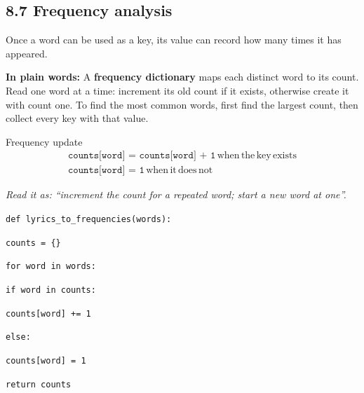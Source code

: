 \documentclass[11pt]{article}
\begin{document}
\begin{keepsection}
\section{8.7 Frequency analysis}

Once a word can be used as a key, its value can record how many times it has appeared.

\begin{plainbox}\textbf{In plain words:} A \textbf{frequency dictionary} maps each distinct word to its count. Read one word at a time: increment its old count if it exists, otherwise create it with count one. To find the most common words, first find the largest count, then collect every key with that value.\end{plainbox}

\begin{equationcard}{Frequency update}
\[ \begin{gathered} \texttt{counts[word] = counts[word] + 1}\, \text{when}\, \text{the}\, \text{key}\, \text{exists} \\ \texttt{counts[word] = 1}\, \text{when}\, \text{it}\, \text{does}\, \text{not} \end{gathered} \]
{\small \emph{Read it as: “increment the count for a repeated word; start a new word at one”.}\par }
\end{equationcard}
\begin{tcolorbox}[colback=Paperblue,colframe=Paperblue,boxrule=0pt,arc=0pt,left=7pt,right=7pt,top=5pt,bottom=5pt]\small\sloppy
\noindent\hspace*{0em}\texttt{def lyrics\_to\_frequencies(words):}\par
\noindent\hspace*{1em}\texttt{counts = \{\}}\par
\noindent\hspace*{1em}\texttt{for word in words:}\par
\noindent\hspace*{3em}\texttt{if word in counts:}\par
\noindent\hspace*{5em}\texttt{counts[word] += 1}\par
\noindent\hspace*{3em}\texttt{else:}\par
\noindent\hspace*{5em}\texttt{counts[word] = 1}\par
\noindent\hspace*{1em}\texttt{return counts}\par
\end{tcolorbox}


\end{keepsection}
\end{document}
